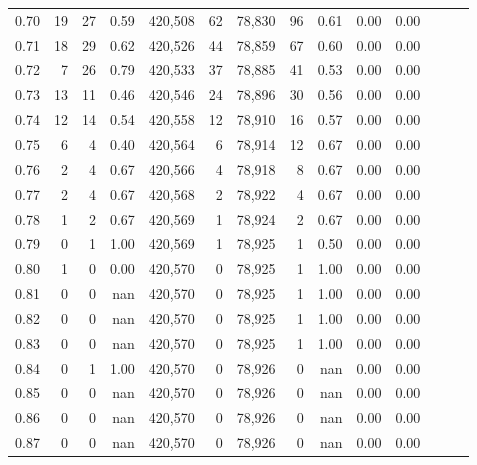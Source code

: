 \begin{tabular}{rrrrrrrrrrrrrr}
0.70 &      19 &     27 &  0.59 &  420,508 &       62 &  78,830 &      96 &  0.61 &  0.00 &      0.00 \\
0.71 &      18 &     29 &  0.62 &  420,526 &       44 &  78,859 &      67 &  0.60 &  0.00 &      0.00 \\
0.72 &       7 &     26 &  0.79 &  420,533 &       37 &  78,885 &      41 &  0.53 &  0.00 &      0.00 \\
0.73 &      13 &     11 &  0.46 &  420,546 &       24 &  78,896 &      30 &  0.56 &  0.00 &      0.00 \\
0.74 &      12 &     14 &  0.54 &  420,558 &       12 &  78,910 &      16 &  0.57 &  0.00 &      0.00 \\
0.75 &       6 &      4 &  0.40 &  420,564 &        6 &  78,914 &      12 &  0.67 &  0.00 &      0.00 \\
0.76 &       2 &      4 &  0.67 &  420,566 &        4 &  78,918 &       8 &  0.67 &  0.00 &      0.00 \\
0.77 &       2 &      4 &  0.67 &  420,568 &        2 &  78,922 &       4 &  0.67 &  0.00 &      0.00 \\
0.78 &       1 &      2 &  0.67 &  420,569 &        1 &  78,924 &       2 &  0.67 &  0.00 &      0.00 \\
0.79 &       0 &      1 &  1.00 &  420,569 &        1 &  78,925 &       1 &  0.50 &  0.00 &      0.00 \\
0.80 &       1 &      0 &  0.00 &  420,570 &        0 &  78,925 &       1 &  1.00 &  0.00 &      0.00 \\
0.81 &       0 &      0 &   nan &  420,570 &        0 &  78,925 &       1 &  1.00 &  0.00 &      0.00 \\
0.82 &       0 &      0 &   nan &  420,570 &        0 &  78,925 &       1 &  1.00 &  0.00 &      0.00 \\
0.83 &       0 &      0 &   nan &  420,570 &        0 &  78,925 &       1 &  1.00 &  0.00 &      0.00 \\
0.84 &       0 &      1 &  1.00 &  420,570 &        0 &  78,926 &       0 &   nan &  0.00 &      0.00 \\
0.85 &       0 &      0 &   nan &  420,570 &        0 &  78,926 &       0 &   nan &  0.00 &      0.00 \\
0.86 &       0 &      0 &   nan &  420,570 &        0 &  78,926 &       0 &   nan &  0.00 &      0.00 \\
0.87 &       0 &      0 &   nan &  420,570 &        0 &  78,926 &       0 &   nan &  0.00 &      0.00 \\

\end{tabular}
